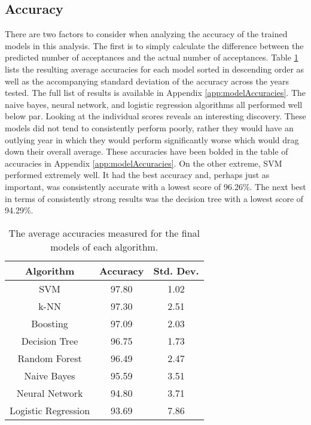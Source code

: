 \documentclass[titlepage]{article}
\begin{document}
\subsection{Accuracy}
There are two factors to consider when analyzing the accuracy of the trained models in this analysis. The first is to simply calculate the difference between the predicted number of acceptances and the actual number of acceptances. Table \ref{tab:accuracies} lists the resulting average accuracies for each model sorted in descending order as well as the accompanying standard deviation of the accuracy across the years tested. The full list of results is available in Appendix \ref{app:modelAccuracies}. The naive bayes, neural network, and logistic regression algorithms all performed well below par. Looking at the individual scores reveals an interesting discovery. These models did not tend to consistently perform poorly, rather they would have an outlying year in which they would perform significantly worse which would drag down their overall average. These accuracies have been bolded in the table of accuracies in Appendix \ref{app:modelAccuracies}. On the other extreme, SVM performed extremely well. It had the best accuracy and, perhaps just as important, was consistently accurate with a lowest score of 96.26\%. The next best in terms of consistently strong results was the decision tree with a lowest score of 94.29\%.
\begin{table}[!b]
\begin{center}
\begin{tabular}{c|c|c}
	\textbf{Algorithm}		&\textbf{Accuracy}	&\textbf{Std. Dev.}\\\hline
	SVM						&97.80				&1.02\\
	k-NN					&97.30				&2.51\\
	Boosting				&97.09				&2.03\\
	Decision Tree			&96.75				&1.73\\
	Random Forest			&96.49				&2.47\\
	Naive Bayes				&95.59				&3.51\\
	Neural Network			&94.80				&3.71\\
	Logistic Regression		&93.69				&7.86
\end{tabular}
\end{center}
\caption{The average accuracies measured for the final models of each algorithm.}
\label{tab:accuracies}
\end{table}~\\
\end{document}
